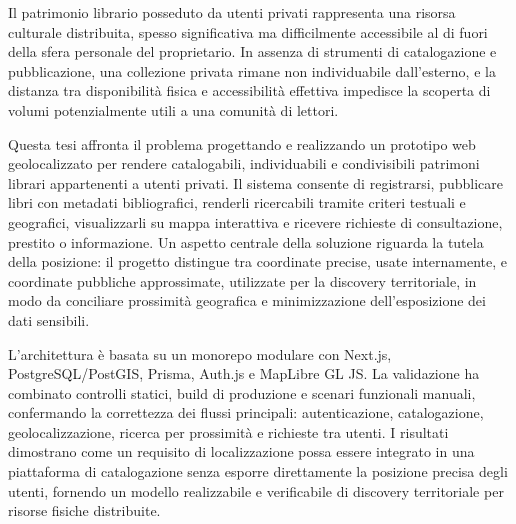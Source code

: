 Il patrimonio librario posseduto da utenti privati rappresenta una risorsa culturale distribuita, spesso significativa ma difficilmente accessibile al di fuori della sfera personale del proprietario. In assenza di strumenti di catalogazione e pubblicazione, una collezione privata rimane non individuabile dall'esterno, e la distanza tra disponibilità fisica e accessibilità effettiva impedisce la scoperta di volumi potenzialmente utili a una comunità di lettori.

Questa tesi affronta il problema progettando e realizzando un prototipo web geolocalizzato per rendere catalogabili, individuabili e condivisibili patrimoni librari appartenenti a utenti privati. Il sistema consente di registrarsi, pubblicare libri con metadati bibliografici, renderli ricercabili tramite criteri testuali e geografici, visualizzarli su mappa interattiva e ricevere richieste di consultazione, prestito o informazione. Un aspetto centrale della soluzione riguarda la tutela della posizione: il progetto distingue tra coordinate precise, usate internamente, e coordinate pubbliche approssimate, utilizzate per la discovery territoriale, in modo da conciliare prossimità geografica e minimizzazione dell'esposizione dei dati sensibili.

L'architettura è basata su un monorepo modulare con Next.js, PostgreSQL/PostGIS, Prisma, Auth.js e MapLibre GL JS. La validazione ha combinato controlli statici, build di produzione e scenari funzionali manuali, confermando la correttezza dei flussi principali: autenticazione, catalogazione, geolocalizzazione, ricerca per prossimità e richieste tra utenti. I risultati dimostrano come un requisito di localizzazione possa essere integrato in una piattaforma di catalogazione senza esporre direttamente la posizione precisa degli utenti, fornendo un modello realizzabile e verificabile di discovery territoriale per risorse fisiche distribuite.
